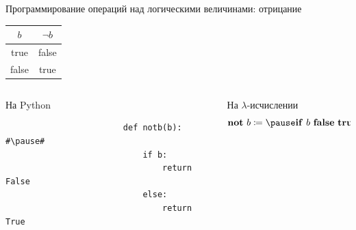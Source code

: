     \begin{frame}[fragile]{Программирование операций над логическими величинами: отрицание}
        \pause
        \begin{center}
            \begin{tabular}{|c|c|}
                \hline
                $b$   & $\neg b$ \\ \hline
                true  & false    \\
                false & true     \\ \hline
            \end{tabular}
        \end{center}

        \begin{columns}[onlytextwidth]
            \begin{column}[t]{0.485\textwidth}
                \begin{block}{На Python}
                    \begin{verbatim}
                        def notb(b): #\pause#
                            if b:
                                return False
                            else:
                                return True
                    \end{verbatim}
                \end{block}
            \end{column}\hfill
            \pause%
            \begin{column}[t]{0.485\textwidth}
                \begin{block}{На $\lambda$-исчислении}
                    \[
                        \term{not}~ b\termdef \pause \term{if} \ap b \ap \term{false} \ap \term{true}
                    \]
                    \vspace{-1em}
                \end{block}
            \end{column}
        \end{columns}
    \end{frame}

